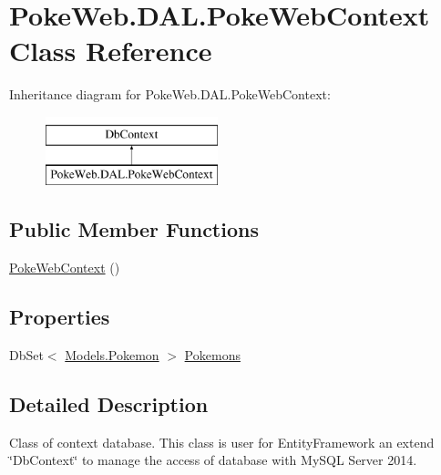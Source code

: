 \hypertarget{class_poke_web_1_1_d_a_l_1_1_poke_web_context}{}\section{Poke\+Web.\+D\+A\+L.\+Poke\+Web\+Context Class Reference}
\label{class_poke_web_1_1_d_a_l_1_1_poke_web_context}
Inheritance diagram for Poke\+Web.\+D\+A\+L.\+Poke\+Web\+Context\+:\begin{figure}[H]
\begin{center}
\leavevmode
\includegraphics[height=2.000000cm]{class_poke_web_1_1_d_a_l_1_1_poke_web_context}
\end{center}
\end{figure}
\subsection*{Public Member Functions}
\begin{DoxyCompactItemize}
\item 
\mbox{\hyperlink{class_poke_web_1_1_d_a_l_1_1_poke_web_context_ad657dbdf7487f5fb5c13fde61726fe3d}{Poke\+Web\+Context}} ()
\end{DoxyCompactItemize}
\subsection*{Properties}
\begin{DoxyCompactItemize}
\item 
Db\+Set$<$ \mbox{\hyperlink{class_poke_web_1_1_models_1_1_pokemon}{Models.\+Pokemon}} $>$ \mbox{\hyperlink{class_poke_web_1_1_d_a_l_1_1_poke_web_context_ac3e453f7ae2467d1910a0db7e074dc93}{Pokemons}}
\end{DoxyCompactItemize}


\subsection{Detailed Description}
Class of context database. This class is user for Entity\+Framework an extend \char`\"{}\+Db\+Context\char`\"{} to manage the access of database with My\+S\+QL Server 2014. 

